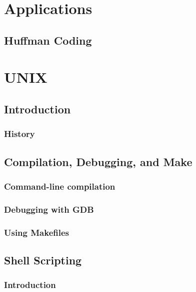 \documentclass[11pt,twoside]{book}
\begin{document}



\part{Applications}

\chapter{Huffman Coding}





\part{UNIX}

\chapter{Introduction}

\section{History}



\chapter{Compilation, Debugging, and Make}

\section{Command-line compilation}

\section{Debugging with GDB}

\section{Using Makefiles}



\chapter{Shell Scripting}

\section{Introduction}
\end{document}
